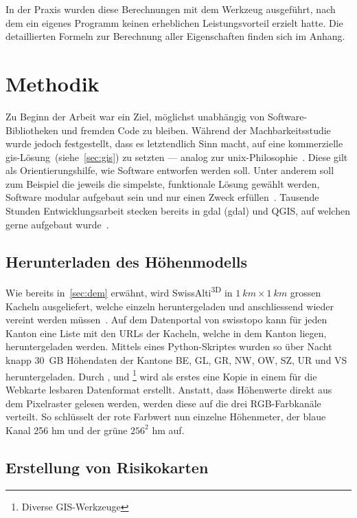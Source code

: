 In der Praxis wurden diese Berechnungen mit dem Werkzeug  ausgeführt, nach dem ein eigenes Programm keinen erheblichen Leistungsvorteil erzielt hatte. Die detaillierten Formeln zur Berechnung aller Eigenschaften finden sich im Anhang.


\vfill

\pagebreak


\section{Methodik}

Zu Beginn der Arbeit war ein Ziel, möglichst unabhängig von Software-Bibliotheken und fremden Code zu bleiben. Während der Machbarkeitsstudie wurde jedoch festgestellt, dass es letztendlich Sinn macht, auf eine kommerzielle \gls{gis}-Lösung~(siehe~\ref{sec:gis}) zu setzten --- analog zur \acrshort{unix}-Philosophie~\cite{unixphil}. Diese gilt als Orientierungshilfe, wie Software entworfen werden soll. Unter anderem soll zum Beispiel die jeweils die simpelste, funktionale Lösung gewählt werden, Software modular aufgebaut sein und nur einen Zweck erfüllen~\cite{unixphil}. Tausende Stunden Entwicklungsarbeit stecken bereits in \acrshort{gdal} (\acrlong{gdal}) und QGIS, auf welchen gerne aufgebaut wurde~\cite{gdalmanual}\cite{qgis}.
\subsection{Herunterladen des Höhenmodells}

Wie bereits in\ \ref{sec:dem} erwähnt, wird SwissAlti\textsuperscript{3D} in $\qty{1}{km} \times \qty{1}{km}$ grossen Kacheln ausgeliefert, welche einzeln heruntergeladen und anschliessend wieder vereint werden müssen~\cite{alti3dprod}. Auf dem Datenportal von swisstopo kann für jeden Kanton eine Liste mit den URLs der Kacheln, welche in dem Kanton liegen, heruntergeladen werden. Mittels eines Python-Skriptes wurden so über Nacht knapp \qty{30}{GB} Höhendaten der Kantone BE, GL, GR, NW, OW, SZ, UR und VS heruntergeladen. Durch ,  und \footnote{Diverse GIS-Werkzeuge} wird als erstes eine Kopie in einem für die Webkarte lesbaren Datenformat erstellt. Anstatt, dass Höhenwerte direkt aus dem Pixelraster gelesen werden, werden diese auf die drei RGB-Farbkanäle verteilt. So schlüsselt der rote Farbwert nun einzelne Höhenmeter, der blaue Kanal 256 hm und der grüne $256^2$ hm auf.

\subsection{Erstellung von Risikokarten}

